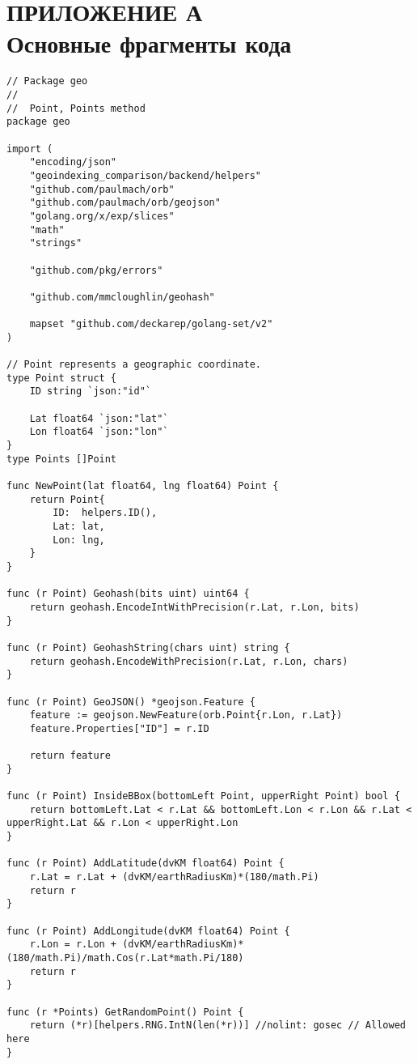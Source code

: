 \chapter*{ПРИЛОЖЕНИЕ А\\\large \textbf{Основные фрагменты кода}}
    
\begin{lstlisting}[caption=points.go]
// Package geo
//
//	Point, Points method
package geo

import (
	"encoding/json"
	"geoindexing_comparison/backend/helpers"
	"github.com/paulmach/orb"
	"github.com/paulmach/orb/geojson"
	"golang.org/x/exp/slices"
	"math"
	"strings"

	"github.com/pkg/errors"

	"github.com/mmcloughlin/geohash"

	mapset "github.com/deckarep/golang-set/v2"
)

// Point represents a geographic coordinate.
type Point struct {
	ID string `json:"id"`

	Lat float64 `json:"lat"`
	Lon float64 `json:"lon"`
}
type Points []Point

func NewPoint(lat float64, lng float64) Point {
	return Point{
		ID:  helpers.ID(),
		Lat: lat,
		Lon: lng,
	}
}

func (r Point) Geohash(bits uint) uint64 {
	return geohash.EncodeIntWithPrecision(r.Lat, r.Lon, bits)
}

func (r Point) GeohashString(chars uint) string {
	return geohash.EncodeWithPrecision(r.Lat, r.Lon, chars)
}

func (r Point) GeoJSON() *geojson.Feature {
	feature := geojson.NewFeature(orb.Point{r.Lon, r.Lat})
	feature.Properties["ID"] = r.ID

	return feature
}

func (r Point) InsideBBox(bottomLeft Point, upperRight Point) bool {
	return bottomLeft.Lat < r.Lat && bottomLeft.Lon < r.Lon && r.Lat < upperRight.Lat && r.Lon < upperRight.Lon
}

func (r Point) AddLatitude(dvKM float64) Point {
	r.Lat = r.Lat + (dvKM/earthRadiusKm)*(180/math.Pi)
	return r
}

func (r Point) AddLongitude(dvKM float64) Point {
	r.Lon = r.Lon + (dvKM/earthRadiusKm)*(180/math.Pi)/math.Cos(r.Lat*math.Pi/180)
	return r
}

func (r *Points) GetRandomPoint() Point {
	return (*r)[helpers.RNG.IntN(len(*r))] //nolint: gosec // Allowed here
}


\end{lstlisting}

